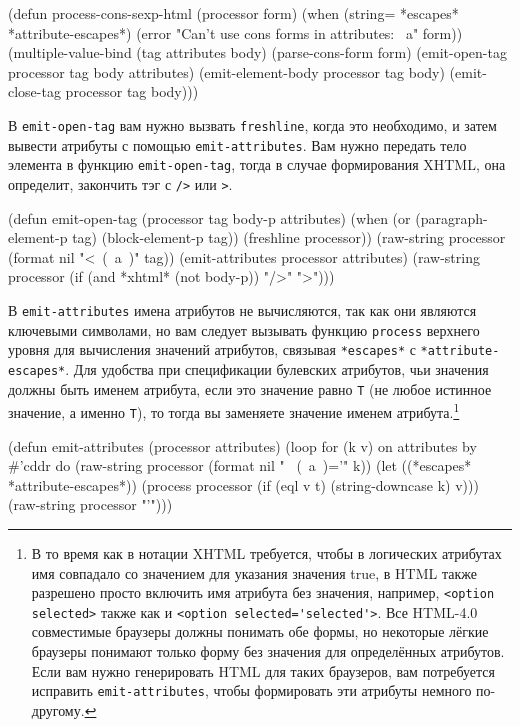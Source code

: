 \begin{myverb}
(defun process-cons-sexp-html (processor form)
  (when (string= *escapes* *attribute-escapes*)
    (error "Can't use cons forms in attributes: ~a" form))
  (multiple-value-bind (tag attributes body) (parse-cons-form form)
    (emit-open-tag     processor tag body attributes)
    (emit-element-body processor tag body)
    (emit-close-tag    processor tag body)))
\end{myverb}

В \lstinline{emit-open-tag} вам нужно вызвать \lstinline{freshline}, когда это необходимо, и затем
вывести атрибуты с помощью \lstinline{emit-attributes}. Вам нужно передать тело элемента в
функцию \lstinline{emit-open-tag}, тогда в случае формирования XHTML, она определит, закончить
тэг с \lstinline{/>} или \lstinline{>}.

\begin{myverb}
(defun emit-open-tag (processor tag body-p attributes)
  (when (or (paragraph-element-p tag) (block-element-p tag))
    (freshline processor))
  (raw-string processor (format nil "<~(~a~)" tag))
  (emit-attributes processor attributes)
  (raw-string processor (if (and *xhtml* (not body-p)) "/>" ">")))
\end{myverb}

В \lstinline{emit-attributes} имена атрибутов не вычисляются, так как они являются
ключевыми символами, но вам следует вызывать функцию \lstinline{process} верхнего уровня
для вычисления значений атрибутов, связывая \lstinline{*escapes*} с
\lstinline{*attribute-escapes*}. Для удобства при спецификации булевских атрибутов, чьи
значения должны быть именем атрибута, если это значение равно \lstinline{Т} (не любое
истинное значение, а именно \lstinline{Т}), то тогда вы заменяете значение именем
атрибута.\footnote{В то время как в нотации XHTML требуется, чтобы в логических атрибутах
  имя совпадало со значением для указания значения true, в HTML также разрешено просто
  включить имя атрибута без значения, например, \lstinline{<option selected>} также как и
  \lstinline{<option selected='selected'>}. Все HTML-4.0 совместимые браузеры должны
  понимать обе формы, но некоторые лёгкие браузеры понимают только форму без значения для
  определённых атрибутов. Если вам нужно генерировать HTML для таких браузеров, вам
  потребуется исправить \lstinline{emit-attributes}, чтобы формировать эти атрибуты
  немного по-другому.}

\begin{myverb}
(defun emit-attributes (processor attributes)
  (loop for (k v) on attributes by #'cddr do
       (raw-string processor (format nil " ~(~a~)='" k))
       (let ((*escapes* *attribute-escapes*))
         (process processor (if (eql v t) (string-downcase k) v)))
       (raw-string processor "'")))
\end{myverb}

